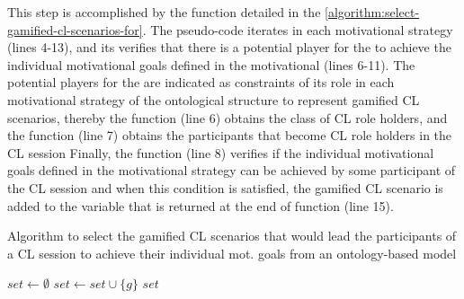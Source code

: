 This step is accomplished by the function  detailed in the \autoref{algorithm:select-gamified-cl-scenarios-for}.
The pseudo-code iterates in each motivational strategy  (lines 4-13), and its verifies that there is a potential player  for the  to achieve the individual motivational goals defined in the motivational   (lines 6-11).
The potential players for the  are indicated as constraints of its role in each motivational strategy of the ontological structure to represent gamified CL scenarios, thereby the function  (line 6) obtains the class of CL role holders, and the function  (line 7) obtains the participants that become CL role holders in the CL session 
Finally, the function  (line 8) verifies if the individual motivational goals defined in the motivational strategy  can be achieved by some participant  of the CL session  and when this condition is satisfied, the gamified CL scenario  is added to the variable  that is returned at the end of function (line 15).

\begin{algoritmo}
\caption{Algorithm to select the gamified CL scenarios that would lead the participants of a CL session  to achieve their individual mot. goals from an ontology-based model }
\label{algorithm:select-gamified-cl-scenarios-for}
\begin{scriptsize}
\begin{algorithmic}[1]
  \State $set \gets \emptyset$
              $set \gets set \cup \{g\}$
            \EndIf
          \EndFor
        \EndFor
      \EndFor
    \EndFor
  \EndFor
  \State \Return $set$
\EndFunction
\end{algorithmic}
\end{scriptsize}
\end{algoritmo}

